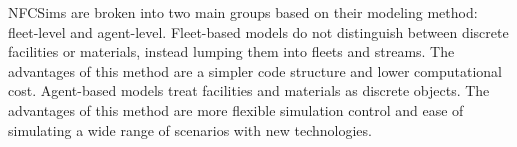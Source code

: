 \begin{table}[]
    \centering
    \caption{Nuclear Fuel Cycle Simulator Tools and their corresponding organizations.}
    \label{tab:nfctools}
    \end{table}

\glspl{NFCSim} are broken into two main groups based on their 
modeling method: fleet-level and agent-level.  
Fleet-based models do not distinguish between discrete facilities 
or materials, instead lumping them into fleets and streams.
The advantages of this method are a simpler code structure and 
lower computational cost. 
Agent-based models treat facilities and materials as discrete 
objects. 
The advantages of this method are more flexible simulation control
and ease of simulating a wide range of scenarios with new 
technologies.  

